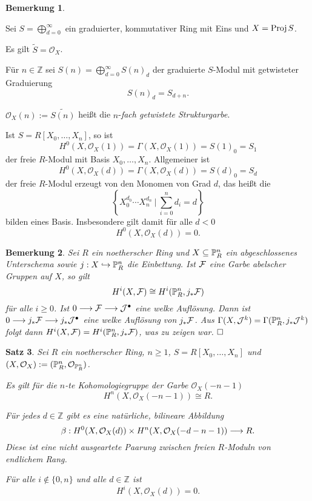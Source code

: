 \documentclass[11pt]{book}
\newtheorem{theorem}{Satz}[section]
\newtheorem{remark}[theorem]{Bemerkung}
\theoremstyle{nonumberbreak}
\newenvironment{pr}[1][]{\ifthenelse{\equal{#1}{}}{\proof}{\proof[#1]}\rm}{\endproof}
\newenvironment{definbem}[1][]{\ifthenelse{\equal{#1}{}}{\definibem}{\definibem[#1]}\rm}{\enddefinibem}
\newcommand{\Proj}{\mathrm{Proj} \hspace{1.5pt}}
\begin{document}
\begin{spacing}{1.4}
\begin{remark}
\end{remark}

\begin{definbem}   %
Sei $S=\bigoplus_{d=0}^{\infty}$ ein graduierter, kommutativer Ring mit Eins und $X= \Proj S$.
\begin{compactenum}
\item Es gilt $\tilde{S}=\mathcal{O}_X$.
\item Für $n \in \mathbb{Z}$ sei $S(n)= \bigoplus_{d=0}^{\infty} S(n)_d$ der graduierte $S$-Modul mit getwisteter Graduierung 
$$S(n)_d= S_{d+n}.$$
\item $\mathcal{O}_X(n) := \widetilde{S(n)}$ heißt die $n$-\textit{fach getwistete Strukturgarbe}.
\item Ist $S=R[X_0, \ldots, X_n]$, so ist
$$H^{0}(X, \mathcal{O}_X(1)) = \Gamma(X, \mathcal{O}_X(1)) = S(1)_0 = S_1$$
der freie $R$-Modul mit Basis $X_0, \ldots, X_n$. Allgemeiner ist 
$$H^{0}(X, \mathcal{O}_X(d)) = \Gamma(X, \mathcal{O}_X(d)) = S(d)_0 = S_d$$
der freie $R$-Modul erzeugt von den Monomen von Grad $d$, das heißt die 
$$\left\{X_0^{d_0} \cdots X_n^{d_n} \ \bigg\vert \ \sum_{i=0}^n d_i = d \right\}$$
bilden eines Basis. Insbesondere gilt damit für alle $d <0$
$$H^{0}(X, \mathcal{O}_X(d)) = 0.$$

\end{compactenum}

\end{definbem}


\begin{remark}
Sei $R$ ein noetherscher Ring und $X \subseteq \mathbb{P}^n_R$ ein abgeschlossenes Unterschema sowie $j: X \hookrightarrow \mathbb{P}^n_R$ die Einbettung. Ist $\mathcal{F}$ eine Garbe abelscher Gruppen auf $X$, so gilt 
$$H^{i}(X, \mathcal{F}) \cong H^{i}(\mathbb{P}^n_R, j_*\mathcal{F})$$
für alle $i \geqslant 0$.
\begin{pr}
Ist $0 \longrightarrow \mathcal{F} \longrightarrow \mathcal{J}^{\bullet}$ eine welke Auflösung. Dann ist $0 \longrightarrow j_*\mathcal{F} \longrightarrow j_* \mathcal{J}^{\bullet}$ eine welke Auflösung von $j_* \mathcal{F}$. Aus $\Gamma(X, \mathcal{J}^k) = \Gamma(\mathbb{P}^n_R, j_*\mathcal{J}^k)$ folgt dann $H^{i}(X, \mathcal{F}) = H^{i}(\mathbb{P}^n_R, j_*\mathcal{F})$, was zu zeigen war. $\hfill \Box$
\end{pr}

\end{remark}


\begin{theorem}   %
Sei $R$ ein noetherscher Ring, $n \geqslant 1$, $S=R[X_0, \ldots, X_n]$ und $(X, \mathcal{O}_X):= (\mathbb{P}^n_R, \mathcal{O}_{\mathbb{P}^n_R})$.
\begin{compactenum}
\item Es gilt für die $n$-te Kohomologiegruppe der Garbe $\mathcal{O}_X({-n-1})$
$$H^{n}(X, \mathcal{O}_X(-n-1)) \cong R.$$
\item Für jedes $d \in \mathbb{Z}$ gibt es eine natürliche, bilineare Abbildung
$$\beta: H^{0}(X, \mathcal{O}_X(d)) \times H^{n}(X, \mathcal{O}_X(-d-n-1)) \longrightarrow R.$$
Diese ist eine nicht ausgeartete Paarung zwischen freien $R$-Moduln von endlichem Rang.
\item Für alle $i \notin \{0,n\}$ und alle $d \in \mathbb{Z}$ ist
$$H^{i}(X, \mathcal{O}_X(d)) = 0.$$


\end{compactenum}
\end{theorem}
\end{spacing}
\end{document}
